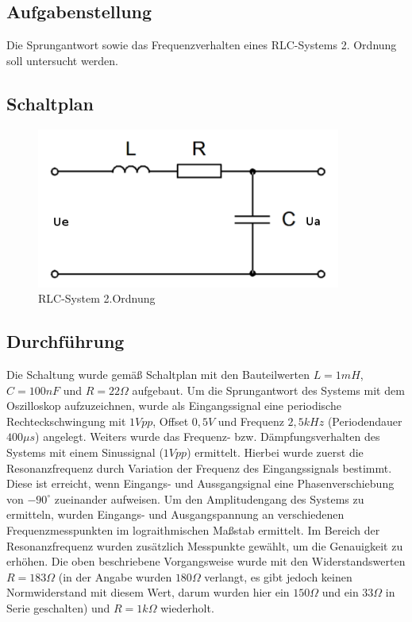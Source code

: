 \documentclass[12pt,a4paper,titlepage]{article}
\begin{document}
\subsection{Aufgabenstellung}
Die Sprungantwort sowie das Frequenzverhalten eines RLC-Systems 2. Ordnung soll untersucht werden.

\subsection{Schaltplan}
\begin{figure}[H]
  \centering
  \includegraphics[width=100mm]{rlc_schaltplan.png}
  \caption{RLC-System 2.Ordnung}
\end{figure}

\subsection{Durchf\"uhrung}
Die Schaltung wurde gem\"aß Schaltplan mit den Bauteilwerten $L=1mH$, $C=100nF$ und $R=22\Omega$ aufgebaut. Um die Sprungantwort des Systems mit dem Oszilloskop aufzuzeichnen, wurde als Eingangssignal eine periodische Rechteckschwingung mit $1Vpp$, Offset $0,5V$ und Frequenz $2,5kHz$ (Periodendauer $400\mu s$) angelegt. Weiters wurde das Frequenz- bzw. D\"ampfungsverhalten des Systems mit einem Sinussignal ($1Vpp$) ermittelt. Hierbei wurde zuerst die Resonanzfrequenz durch Variation der Frequenz des Eingangssignals bestimmt. Diese ist erreicht, wenn Eingangs- und Aussgangsignal eine Phasenverschiebung von $-90^{\circ}$ zueinander aufweisen. Um den Amplitudengang des Systems zu ermitteln, wurden Eingangs- und Ausgangspannung an verschiedenen Frequenzmesspunkten im lograithmischen Maßstab ermittelt. Im Bereich der Resonanzfrequenz wurden zusätzlich Messpunkte gewählt, um die Genauigkeit zu erhöhen. Die oben beschriebene Vorgangsweise wurde mit den Widerstandswerten $R = 183 \Omega$ (in der Angabe wurden $180\Omega$ verlangt, es gibt jedoch keinen Normwiderstand mit diesem Wert, darum wurden hier ein $150\Omega$ und ein $33\Omega$ in Serie geschalten) und $R = 1k\Omega$ wiederholt.
\end{document}
